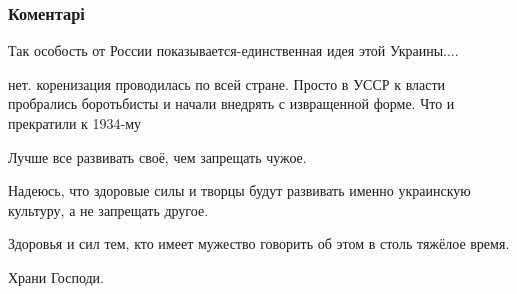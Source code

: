  
 
 
 
 
\subsubsection{Коментарі}

\begin{itemize}
 
Так особость от России показывается-единственная идея этой Украины....

\begin{itemize}
 
нет. коренизация проводилась по всей стране. Просто в УССР к власти пробрались
боротьбисты и начали внедрять с извращенной форме. Что и прекратили к 1934-му
\end{itemize}

 

Лучше все развивать своё, чем запрещать чужое. 

Надеюсь, что здоровые силы и
творцы будут развивать именно украинскую культуру, а не запрещать другое.

Здоровья и сил тем, кто имеет мужество говорить об этом в столь тяжёлое время.

Храни Господи.

\begin{itemize}
 

\end{itemize}
\end{itemize}
